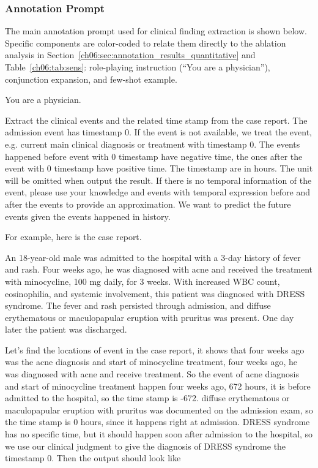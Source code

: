 \subsubsection{Annotation Prompt}\label{ch06:apd:prompt}
The main annotation prompt used for clinical finding extraction is shown below. 
Specific components are color-coded to relate them directly to the ablation analysis in Section~\ref{ch06:sec:annotation_results_quantitative} and Table~\ref{ch06:tab:sens}: \textcolor{ChSixDarkPurple}{role-playing instruction} (``You are a physician''), \textcolor{ChSixDarkRed}{conjunction expansion}, and \textcolor{ChSixDarkTeal}{few-shot example}.



\begin{tcolorbox}[breakable,
  colback=teal!5,
  colframe=teal!70!black,
  title=Textual Time Series Generation Prompt,
  boxrule=2pt,
]
\footnotesize
\setlength{\parskip}{1pt}
\color{ChSixDarkPurple} You are a physician. 

\color{black}  Extract the clinical events and the related time stamp from the case report. The admission event has timestamp 0. If the event is not available, we treat the event, e.g. current main clinical diagnosis or treatment with timestamp 0. The events happened before event with 0 timestamp have negative time, the ones after the event with 0 timestamp have positive time. The timestamp are in hours. The unit will be omitted when output the result. If there is no temporal information of the event, please use your knowledge and events with temporal expression before and after the events to provide an approximation. We want to predict the future events given the events happened in history. 

\color{ChSixDarkTeal} For example, here is the case report.

An 18-year-old male was admitted to the hospital with a 3-day history of fever and rash. Four weeks ago, he was diagnosed with acne and received the treatment with minocycline, 100 mg daily, for 3 weeks. With increased WBC count, eosinophilia, and systemic involvement, this patient was diagnosed with DRESS syndrome. The fever and rash persisted through admission, and diffuse erythematous or maculopapular eruption with pruritus was present. One day later the patient was discharged.

Let's find the locations of event in the case report, it shows that four weeks ago was the acne diagnosis and start of minocycline treatment, four weeks ago, he was diagnosed with acne and receive treatment. So the event of acne diagnosis and start of minocycline treatment happen four weeks ago, 672 hours, it is before admitted to the hospital, so the time stamp is -672. diffuse erythematous or maculopapular eruption with pruritus was documented on the admission exam, so the time stamp is 0 hours, since it happens right at admission. DRESS syndrome has no specific time, but it should happen soon after admission to the hospital, so we use our clinical judgment to give the diagnosis of DRESS syndrome the timestamp 0. Then the output should look like


\end{tcolorbox}
